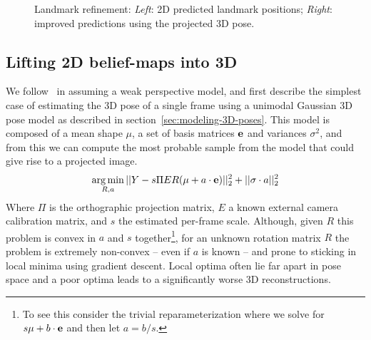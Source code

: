 \documentclass[10pt,twocolumn,letterpaper]{article}
\DeclareMathOperator*{\argmin}{arg\,min}
\begin{document}
\begin{figure}
\vspace{-5mm}
  \caption{\small Landmark refinement:    \textit{Left}: 2D predicted landmark
    positions; \textit{Right}: improved predictions using the projected 3D
    pose.\label{fig:manifold_2D_correction}
  }
\end{figure}


\subsection{Lifting 2D belief-maps into 3D}
\label{sec:recovering-3D-from}\vspace{-2mm}
We follow~\cite{zhou2015sparseness} in assuming a weak perspective model, and
first describe the simplest case of estimating the 3D pose of a single frame
using a unimodal Gaussian 3D pose model as described in
section~\ref{sec:modeling-3D-poses}. This model is composed of a mean shape
$\mu$, a set of basis matrices ${\bf e}$ and variances $\sigma^2$, and from this
we can compute the most probable sample from the model that could give rise to a
projected image.
%
%
\begin{equation}\label{eq:get3d}
\argmin_{R,a}   ||Y -s\Pi E R (\mu + a\cdot {\bf e}  )||_2^2 +||\sigma\cdot a||_2^2
\end{equation}
%
Where $\Pi$ is the %
orthographic projection matrix, $E$ a
known external camera calibration matrix, and $s$ the estimated
per-frame scale. Although, given $R$ this problem is convex in $a$ and
$s$ together\footnote{To see this consider the trivial
  reparameterization where we solve for $s\mu +b \cdot {\bf e}$ and
  then let $a=b/s$.}, for an unknown rotation matrix $R$ the problem
is extremely non-convex -- even if $a$ is known -- and prone to
sticking in local minima using %
gradient
descent. Local optima often lie far apart in pose space and
 a poor optima leads to a significantly worse 3D
reconstructions.
\end{document}
